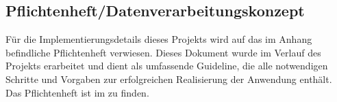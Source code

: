 \subsection{Pflichtenheft/Datenverarbeitungskonzept}
\label{sec:Pflichtenheft}

Für die Implementierungsdetails dieses Projekts wird auf das im Anhang befindliche Pflichtenheft verwiesen. Dieses Dokument wurde im Verlauf des Projekts erarbeitet und dient als umfassende Guideline, die alle notwendigen Schritte und Vorgaben zur erfolgreichen Realisierung der Anwendung enthält. Das Pflichtenheft ist im  zu finden.
